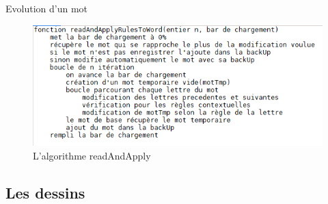 \documentclass{beamer}
\begin{document}
\begin{frame}
	\begin{block}{Evolution d'un mot}

	\begin{figure}[h]
	\includegraphics[scale=0.55]{images/readAndApply.png}
	\caption{L'algorithme readAndApply}
	\end{figure}
	

	\end{block}
\end{frame}




\subsection{Les dessins}
\end{document}
